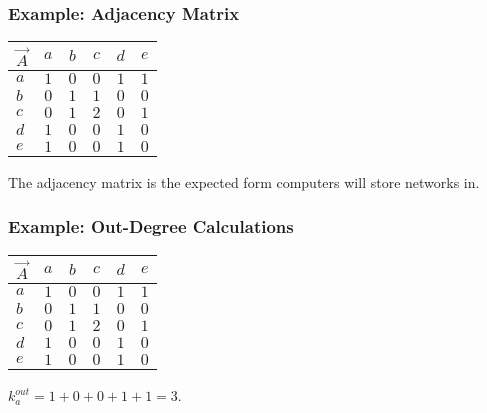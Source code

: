\documentclass{beamer}
\newcommand{\ds}{\displaystyle}
\begin{document}
\begin{frame}

    \frametitle{Example: Adjacency Matrix}

    \begin{center}
        \begin{tabular}{l | c c c c c} 
            $ \vec{A} $ & $ a $ & $ b $ & $ c $ & $ d $ & $ e $ \\
            \hline
            $ a $ & $ 1 $ & $ 0 $ & $ 0 $ & $ 1 $ & $ 1 $ \\
            $ b $ & $ 0 $ & $ 1 $ & $ 1 $ & $ 0 $ & $ 0 $ \\
            $ c $ & $ 0 $ & $ 1 $ & $ 2 $ & $ 0 $ & $ 1 $ \\
            $ d $ & $ 1 $ & $ 0 $ & $ 0 $ & $ 1 $ & $ 0 $ \\
            $ e $ & $ 1 $ & $ 0 $ & $ 0 $ & $ 1 $ & $ 0 $ \\
        \end{tabular}
    \end{center}\pause

    \vspace{2.5mm}
    The adjacency matrix is the expected form computers will store networks in. 

\end{frame}

\begin{frame}

    \frametitle{Example: Out-Degree Calculations}

    \begin{center}
        \begin{tabular}{l | c c c c c} 
            $ \vec{A} $ & $ a $ & $ b $ & $ c $ & $ d $ & $ e $ \\
            \hline
            \rowcolor{ummaize}
            $ a $ & $ 1 $ & $ 0 $ & $ 0 $ & $ 1 $ & $ 1 $ \\
            $ b $ & $ 0 $ & $ 1 $ & $ 1 $ & $ 0 $ & $ 0 $ \\
            $ c $ & $ 0 $ & $ 1 $ & $ 2 $ & $ 0 $ & $ 1 $ \\
            $ d $ & $ 1 $ & $ 0 $ & $ 0 $ & $ 1 $ & $ 0 $ \\
            $ e $ & $ 1 $ & $ 0 $ & $ 0 $ & $ 1 $ & $ 0 $ \\
        \end{tabular}
    \end{center}\pause

    \vspace{2.5mm}
    $ \ds k_{a}^{out} = 1 + 0 + 0 + 1 + 1 = 3 $. 

\end{frame}
\end{document}
